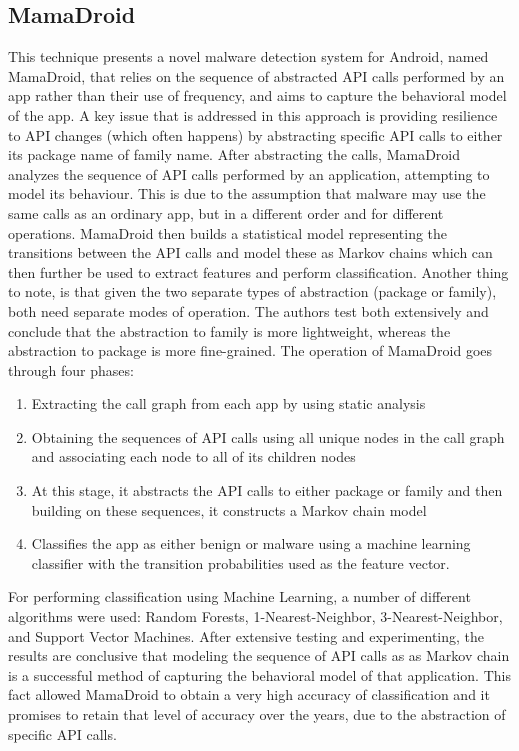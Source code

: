 \documentclass[11pt]{article}
\begin{document}
	\subsection{MamaDroid}
	This technique presents a novel malware detection system for Android, named MamaDroid, that relies on the sequence of abstracted API calls performed by an app rather than their use of frequency, and aims to capture the behavioral model of the app. A key issue that is addressed in this approach is providing resilience to API changes (which often happens) by abstracting specific API calls to either its package name of family name.
	After abstracting the calls, MamaDroid analyzes the sequence of API calls performed by an application, attempting to model its behaviour. This is due to the assumption that malware may use the same calls as an ordinary app, but in a different order and for different operations. MamaDroid then  builds a statistical model representing the transitions between the API calls and model these as Markov chains which can then further be used to extract features and perform classification. Another thing to note, is that given the two separate types of abstraction (package or family), both need separate modes of operation. The authors test both extensively and conclude that the abstraction to family is more lightweight, whereas the abstraction to package is more fine-grained.
	The operation of MamaDroid goes through four phases:
	\begin{enumerate}
		\item Extracting the call graph from each app by using static analysis
		\item Obtaining the sequences of API calls using all unique nodes in the call graph and associating each node to all of its children nodes
		\item At this stage, it abstracts the API calls to either package or family and then building on these sequences, it constructs a Markov chain model
		\item Classifies the app as either benign or malware using a machine learning classifier with the transition probabilities used as the feature vector. 
	\end{enumerate}
	For performing classification using Machine Learning, a number of different algorithms were used: Random Forests, 1-Nearest-Neighbor, 3-Nearest-Neighbor, and Support Vector Machines. After extensive testing and experimenting, the results are conclusive that modeling the sequence of API calls as as Markov chain is a successful method of capturing the behavioral model of that application. This fact allowed MamaDroid to obtain a very high accuracy of classification and it promises to retain that level of accuracy over the years, due to the abstraction of specific API calls.
	
\end{document}
